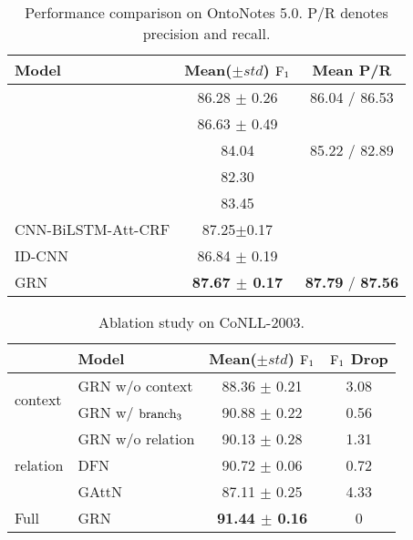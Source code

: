 \documentclass[letterpaper]{article} \usepackage{aaai19}  \usepackage{times}  \usepackage{helvet}  \usepackage{courier}  \usepackage{url}  \usepackage{graphicx}  \usepackage{amsmath}
\newcommand{\GAN}{GAttN}
\newcommand{\GRN}{GRN}
\begin{document}
\begin{table}[t!]
  \centering
    \begin{adjustbox}{width=0.95\columnwidth}
    \begin{tabular}{|l|c|c|}
      \hline
       Model & Mean($\pm std$) $\rm{F_1}$ & Mean P/R  \\ \hline
       \cite{chiu2016named} & 86.28 $\pm$ 0.26 & 86.04 / 86.53\\ \hline
       \cite{shen2017deep} & 86.63 $\pm$ 0.49 & \\ \hline
       \cite{durrett2014joint} & 84.04 & 85.22 / 82.89\\ \hline
       \cite{passos2014lexicon} & 82.30 & \\ \hline
       \cite{ratinov2009design} & 83.45 & \\ \hline
       CNN-BiLSTM-Att-CRF &87.25$\pm$0.17 &\\ \hline
       ID-CNN~\cite{strubell2017fast} & 86.84 $\pm$ 0.19 &  \\ \hline
       \GRN{} & \textbf{87.67 $\pm$ 0.17} & \textbf{87.79} / \textbf{87.56}\\ \hline
    \end{tabular}
    \end{adjustbox}
    \caption{Performance comparison on OntoNotes 5.0. P/R denotes precision and recall.}
    \label{tab:compare_OntoNote}
\end{table}

\begin{table}[t!]
  \centering
    \begin{adjustbox}{max width=0.9\columnwidth}
    \begin{tabular}{|l|l|c|c|}
      \hline
       &Model & Mean($\pm std$) $\rm{F_1}$ & $\rm{F_1}$ Drop  \\ \hline
       \multirow{2}{*}{context} &\GRN{} w/o context & 88.36 $\pm$ 0.21 & 3.08 \\ \cline{2-4}
        &\GRN{} w/ $\rm branch_3$ & 90.88 $\pm$ 0.22 & 0.56 \\ \hline
       \hline
       \multirow{3}{*}{relation} &\GRN{} w/o relation & 90.13 $\pm$ 0.28 & 1.31\\ \cline{2-4}
       &DFN & 90.72 $\pm$ 0.06  & 0.72\\ \cline{2-4}
       &\GAN{} & 87.11 $\pm$ 0.25  & 4.33\\ \hline
       \hline
       Full&\GRN{} & \textbf{91.44 $\pm$ 0.16}  & 0\\ \hline
    \end{tabular}
    \end{adjustbox}
    \caption{Ablation study on CoNLL-2003.}\label{tab:compare_ablation_conll}
\end{table}
\end{document}
